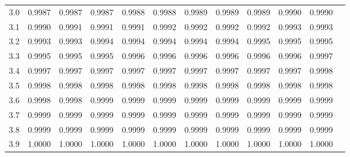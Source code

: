 \documentclass[a4paper,12pt, twoside]{article}
\begin{document}
\begin{center}
\begin{tabular}{rr@{\ }r@{\ }r@{\ }r@{\ }r@{\ }r@{\ }r@{\ }r@{\ }r@{\ }r@{\ }r}
3.0&0.9987&0.9987&0.9987&0.9988&0.9988&0.9989&0.9989&0.9989&0.9990&0.9990\\
3.1&0.9990&0.9991&0.9991&0.9991&0.9992&0.9992&0.9992&0.9992&0.9993&0.9993\\
3.2&0.9993&0.9993&0.9994&0.9994&0.9994&0.9994&0.9994&0.9995&0.9995&0.9995\\
3.3&0.9995&0.9995&0.9995&0.9996&0.9996&0.9996&0.9996&0.9996&0.9996&0.9997\\
3.4&0.9997&0.9997&0.9997&0.9997&0.9997&0.9997&0.9997&0.9997&0.9997&0.9998\\
3.5&0.9998&0.9998&0.9998&0.9998&0.9998&0.9998&0.9998&0.9998&0.9998&0.9998\\
3.6&0.9998&0.9998&0.9999&0.9999&0.9999&0.9999&0.9999&0.9999&0.9999&0.9999\\
3.7&0.9999&0.9999&0.9999&0.9999&0.9999&0.9999&0.9999&0.9999&0.9999&0.9999\\
3.8&0.9999&0.9999&0.9999&0.9999&0.9999&0.9999&0.9999&0.9999&0.9999&0.9999\\
3.9&1.0000&1.0000&1.0000&1.0000&1.0000&1.0000&1.0000&1.0000&1.0000&1.0000
\end{tabular}
\end{center}
\end{document}

